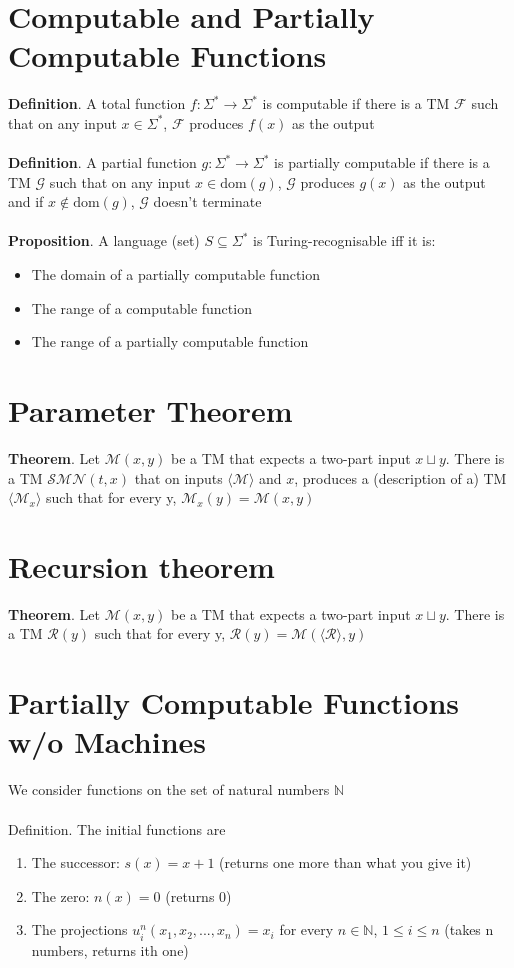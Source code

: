 \documentclass{article}[18pt]
\begin{document}
\section{Computable and Partially Computable Functions}
\textbf{Definition}. A total function $f: \Sigma^*\rightarrow \Sigma^*$ is computable if there is a TM $\mathscr{F}$ such that on any input $x\in \Sigma^*$, $\mathscr{F}$ produces $f(x)$ as the output\\
\\
\textbf{Definition}. A partial function $g:\Sigma^*\rightarrow \Sigma^*$ is partially computable if there is a TM $\mathscr{G}$ such that on any input $x\in \text{dom}(g)$, $\mathscr{G}$ produces $g(x)$ as the output and if $x \notin \text{dom}(g)$, $\mathscr{G}$ doesn't terminate\\
\\
\textbf{Proposition}. A language (set) $S\subseteq \Sigma^*$ is Turing-recognisable iff it is:
\begin{itemize}
	\item The domain of a partially computable function
	\item The range of a computable function
	\item The range of a partially computable function
\end{itemize}
\section{Parameter Theorem}
\textbf{Theorem}. Let $\mathscr{M}(x,y)$ be a TM that expects a two-part input $x\sqcup y$. There is a TM $\mathscr{SMN} (t,x)$ that on inputs $\langle \mathscr{M}\rangle$ and $x$, produces a (description of a) TM $\langle \mathscr{M}_x \rangle$ such that for every y, $\mathscr{M}_x(y)=\mathscr{M}(x,y)$
\section{Recursion theorem}
\textbf{Theorem}. Let $\mathscr{M}(x,y)$ be a TM that expects a two-part input $x\sqcup y$. There is a TM $\mathscr{R}(y)$ such that for every y, $\mathscr{R}(y)=\mathscr{M}(\langle \mathscr{R} \rangle, y)$
\section{Partially Computable Functions w/o Machines}
We consider functions on the set of natural numbers $\mathbb{N}$\\
\\
Definition. The initial functions are
\begin{enumerate}
	\item The successor: $s(x)=x+1$ (returns one more than what you give it)
	\item The zero: $n(x)=0$ (returns 0)
	\item The projections $u_i^n(x_1,x_2,...,x_n)=x_i$ for every $n\in \mathbb{N}$, $1\leqslant i \leqslant n$ (takes n numbers, returns ith one)
\end{enumerate}
\end{document}

